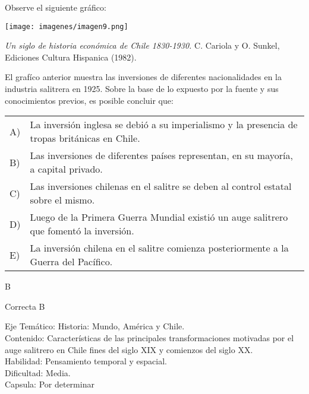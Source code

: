 \documentclass[letterpaper,11pt]{article}
\newcommand{\anchopregunta}{0.9\textwidth}
\begin{document}
\begin{enumerate}
\begin{minipage}{\anchopregunta}
\item Observe el siguiente gráfico:
\begin{center}
    \texttt{[image: imagenes/imagen9.png]}
\end{center}
\begin{flushright}
\textit{Un siglo de historia económica
de Chile 1830-1930.} C. Cariola y O. Sunkel, Ediciones Cultura Hispanica (1982).
\end{flushright}
El grafíco anterior muestra las inversiones de diferentes nacionalidades en la industria salitrera en 1925. Sobre la base de lo expuesto por la fuente y sus conocimientos previos, es posible concluir que:
\begin{flushleft}\begin{tabular}{@{\hspace{-.001\textwidth}}l@{\hspace{2pt}}p{}}
A)& La inversión inglesa se debió a su imperialismo y la presencia de tropas británicas en Chile.\\
B)& Las inversiones de diferentes países representan, en su mayoría, a capital privado.\\
C)& Las inversiones chilenas en el salitre se deben al control estatal sobre el mismo.\\
D)& Luego de la Primera Guerra Mundial existió un auge salitrero que fomentó la inversión.\\
E)& La inversión chilena en el salitre comienza posteriormente a la Guerra del Pacífico.\\ 
\end{tabular}\end{flushleft}%
\begin{key} B
\end{key} 
\begin{hint}
\end{hint}
\begin{answer} Correcta B\\
\end{answer}
\begin{info} %
\begin{flushleft}
Eje Temático: Historia: Mundo, América y Chile.\\
Contenido: Características de las principales transformaciones motivadas por el auge salitrero en Chile fines del siglo XIX y comienzos del siglo XX. \\
Habilidad: Pensamiento temporal y espacial.\\
Dificultad: Media.\\
Capsula: Por determinar \\
\end{flushleft} 
\end{info}
\end{minipage}\vfill$\;$ %


\end{enumerate}
\end{document}
